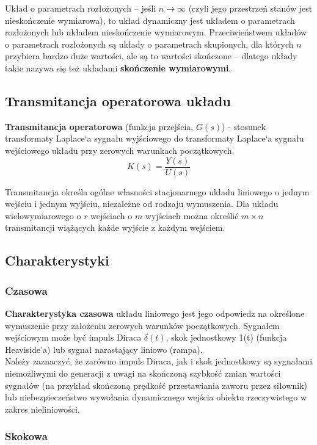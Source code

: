 \documentclass[a4paper,twoside]{report}
\begin{document}
Układ o parametrach rozłożonych – jeśli $n \to \infty $ (czyli jego przestrzeń stanów jest nieskończenie wymiarowa), to układ dynamiczny jest układem o parametrach rozłożonych lub układem nieskończenie wymiarowym. Przeciwieństwem układów o parametrach rozłożonych są układy o parametrach skupionych, dla których $n$ przybiera bardzo duże wartości, ale są to wartości skończone – dlatego układy takie nazywa się też układami \textbf{skończenie wymiarowymi}.	
	
	
	
\subsection{Transmitancja operatorowa układu}
\textbf{Transmitancja operatorowa} (funkcja przejścia, $G(s)$) - stosunek transformaty Laplace`a sygnału wyjściowego do transformaty Laplace`a sygnału wejściowego układu przy zerowych warunkach początkowych.
\begin{equation}
K(s)=\dfrac{Y(s)}{U(s)}
\end{equation}

Transmitancja określa ogólne własności stacjonarnego układu liniowego o jednym wejściu i jednym wyjściu, niezależne od rodzaju wymuszenia. Dla układu wielowymiarowego o $r$ wejściach o $m$ wyjściach można określić $m \times n$ transmitancji wiążących każde wyjście z każdym wejściem.
\subsection{Charakterystyki}
\subsubsection{Czasowa}
{\textbf{Charakterystyka czasowa}} układu liniowego jest jego odpowiedz na określone
wymuszenie przy założeniu zerowych warunków początkowych. Sygnałem
wejściowym może być impuls Diraca $ \delta(t) $, skok jednostkowy 1(t) (funkcja
Heaviside’a) lub sygnał narastający liniowo (rampa).\\

Należy zaznaczyć, że zarówno impuls Diraca, jak i skok jednostkowy są sygnałami niemożliwymi do generacji z uwagi na skończoną szybkość zmian
wartości sygnałów (na przykład skończoną prędkość przestawiania zaworu
przez siłownik) lub niebezpieczeństwo wywołania dynamicznego wejścia
obiektu rzeczywistego w zakres nieliniowości.
		
\subsubsection{Skokowa}
\end{document}
